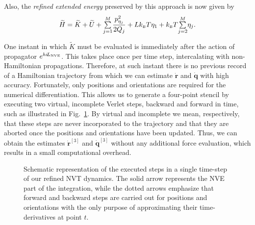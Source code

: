 \documentclass[
	aip,
	jcp,
	reprint,
]{revtex4-1}
\newcommand{\vt}[1]{\boldsymbol{\mathbf{#1}}}          %
\newcommand{\Liu}[1]{i\!L_\text{#1}}                   %
\newcommand{\timestep}{h}
\newcommand{\refined}[1]{\widetilde{#1}}
\newcommand{\mini}[1]{\text{\tiny{#1}}}
\begin{document}
Also, the \textit{refined extended energy} preserved by this approach is now given by
\begin{equation}
\label{eq:this extended energy}
{\refined H} = \refined K + \refined U + {\textstyle\sum\limits_{j=1}^{M}} \frac{p_{\eta_j}^2}{2Q_j} + L k_\mini{B} T\eta_1 + k_\mini{B} T {\textstyle\sum\limits_{j=2}^{M}} \eta_j.
\end{equation}

One instant in which $\refined K$ must be evaluated is immediately after the action of propagator $e^{\timestep \Liu{\tiny NVE}}$.
This takes place once per time step, intercalating with non-Hamiltonian propagations.
Therefore, at such instant there is no previous record of a Hamiltonian trajectory from which we can estimate $\dot{\vt r}$ and $\dot{\vt q}$ with high accuracy.
Fortunately, only positions and orientations are required for the numerical differentiation.
This allows us to generate a four-point stencil by executing two virtual, incomplete Verlet steps, backward and forward in time, such as illustrated in Fig.~\ref{fig:virtual steps}.
By virtual and incomplete we mean, respectively, that these steps are never incorporated to the trajectory and that they are aborted once the positions and orientations have been updated.
Thus, we can obtain the estimates $\dot{\vt r}^{[3]}$ and $\dot{\vt q}^{[3]}$ without any additional force evaluation, which results in a small computational overhead.

\begin{figure}
\caption{Schematic representation of the executed steps in a single time-step of our refined NVT dynamics.
The solid arrow represents the NVE part of the integration, while the dotted arrows emphasize that forward and backward steps are carried out for positions and orientations with the only purpose of approximating their time-derivatives at point $t$.}
\label{fig:virtual steps}
\end{figure}
\end{document}

